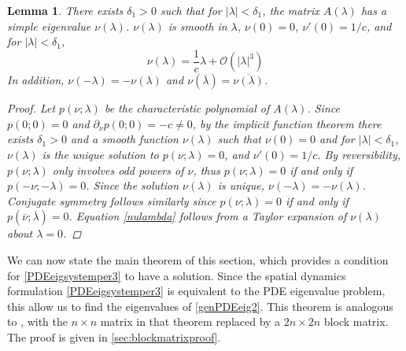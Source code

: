 \documentclass[10pt,reqno]{amsart}
\theoremstyle{plain}
\newtheorem{lemma}[theorem]{Lemma}
\theoremstyle{definition}
\theoremstyle{remark}
\numberwithin{theorem}{section}
\numberwithin{equation}{section}
\begin{document}
\begin{lemma}\label{nulambdalemma}
There exists $\delta_1 > 0$ such that for $|\lambda| < \delta_1$, the matrix $A(\lambda)$ has a simple eigenvalue $\nu(\lambda)$. $\nu(\lambda)$ is smooth in $\lambda$, $\nu(0) = 0$, $\nu'(0) = 1/c$, and for $|\lambda| < \delta_1$,
\begin{equation}\label{nulambda}
\nu(\lambda) = \frac{1}{c} \lambda + \mathcal{O}(|\lambda|^3)
\end{equation}
In addition, $\nu(-\lambda) = -\nu(\lambda)$ and $\nu(\overline{\lambda}) = \overline{\nu(\lambda)}$.
\begin{proof}
Let $p(\nu; \lambda)$ be the characteristic polynomial of $A(\lambda)$. Since $p(0; 0) = 0$ and $\partial_\nu p(0; 0) = -c \neq 0$, by the implicit function theorem there exists $\delta_1 > 0$ and a smooth function $\nu(\lambda)$ such that $\nu(0) = 0$ and for $|\lambda| < \delta_1$, $\nu(\lambda)$ is the unique solution to $p(\nu; \lambda) = 0$, and $\nu'(0) = 1/c$. By reversibility, $p(\nu; \lambda)$ only involves odd powers of $\nu$, thus $p(\nu; \lambda) = 0$ if and only if $p(-\nu; -\lambda) = 0$. Since the solution $\nu(\lambda)$ is unique, $\nu(-\lambda) = -\nu(\lambda)$. Conjugate symmetry follows similarly since $p(\nu; \lambda) = 0$ if and only if $p(\overline{\nu}; \overline{\lambda}) = 0$. Equation \cref{nulambda} follows from a Taylor expansion of $\nu(\lambda)$ about $\lambda = 0$. 
\end{proof}
\end{lemma}

We can now state the main theorem of this section, which provides a condition for \cref{PDEeigsystemper3} to have a solution. Since the spatial dynamics formulation \cref{PDEeigsystemper3} is equivalent to the PDE eigenvalue problem, this allow us to find the eigenvalues of \cref{genPDEeig2}. This theorem is analogous to \cite[Theorem 2]{Sandstede1998}, with the $n\times n$ matrix in that theorem replaced by a $2n\times 2n$ block matrix. The proof is given in \cref{sec:blockmatrixproof}.
\end{document}
